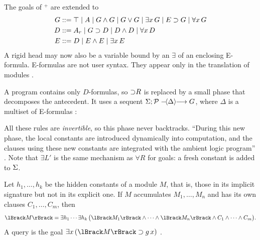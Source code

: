 \begin{definition}\label{def:hoprog-eformula}
The goals of \hohh$^+$ are extended to
\begin{align*}
G &::= \top \mid A \mid G\wedge G \mid G\vee G \mid \exists x\,G \mid E\supset G \mid \forall x\,G\\
D &::= A_r \mid G\supset D \mid D\wedge D \mid \forall x\,D\\
E &::= D \mid E\wedge E \mid \exists x\,E
\end{align*}
A rigid head may now also be a variable bound by an $\exists$ of an enclosing E-formula. E-formulas are
not user syntax. They appear only in the translation of modules .
\end{definition}

A program contains only $D$-formulas, so ${\supset}R$ is replaced by a small phase that decomposes the
antecedent. It uses a sequent $\Sigma;\mathcal{P}\mathrel{-\!\langle \Delta\rangle\!\!\longrightarrow}G$, where $\Delta$ is a multiset of E-formulas
:
All these rules are \emph{invertible}, so this phase never backtracks. ``During this new phase, the local
constants are introduced dynamically into computation, and the clauses using these new constants are
integrated with the ambient logic program'' . Note that $\exists L'$ is the same mechanism as
$\forall R$ for goals: a fresh constant is added to $\Sigma$.

\begin{definition}\label{def:hoprog-modformula}
Let $h_1,\ldots,h_k$ be the hidden constants of a module $M$, that is, those in its implicit signature but
not in its explicit one. If $M$ accumulates $M_1,\ldots,M_n$ and has its own clauses $C_1,\ldots,C_m$, then
\[
\hoprogT{M} = \exists h_1\cdots\exists h_k\,\big(\hoprogT{M_1}\wedge\cdots\wedge\hoprogT{M_n}\wedge C_1\wedge\cdots\wedge C_m\big).
\]
A query  is the goal $\exists x\,(\hoprogT{M}\imp g\,x)$ .
\end{definition}

